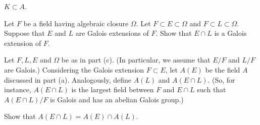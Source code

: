 \begin{alist}
\begin{rlist}
\item $K\subset A$.
\end{rlist}
\item Let $F$ be a field having algebraic closure $\Omega$. Let
$F\subset E\subset \Omega$ and $F\subset L\subset \Omega$. Suppose
that $E$ and $L$ are Galois extensions of $F$. Show that $E\cap L$ is
a Galois extension of $F$.
\item Let $F,L,E$ and $\Omega$ be as in part (c). (In particular, we
assume that $E/F$ and $L/F$ are Galois.) Considering the Galois
extension $F\subset E$, let $A(E)$ be the field $A$ discussed in part
(a). Analogously, define $A(L)$ and $A(E\cap L)$. (So, for instance,
$A(E\cap L)$ is the largest field between $F$ and $E\cap L$ such that
$A(E\cap L)/F$ is Galois and has an abelian Galois group.)

Show that $A(E\cap L)=A(E)\cap A(L)$.
\end{alist}
